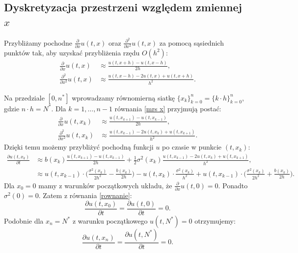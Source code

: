 \documentclass{article}
\begin{document}
\subsection{Dyskretyzacja przestrzeni względem zmiennej $x$}\label{mrs dys}

Przybliżamy pochodne \(\frac{\partial}{\partial x} u(t, x)\) oraz \(\frac{\partial^{2}}{\partial {x}^{2}} u(t, x)\) za pomocą sąsiednich punktów tak, aby uzyskać przybliżenia rzędu $O(h^2)$:
\begin{equation}\label{mrs x}
\begin{aligned}
\frac{\partial}{\partial x} u(t, x) &\approx \frac{u(t, x+h) - u(t, x-h)}{2 h}, \\
\frac{\partial^{2}}{\partial {x}^{2}} u(t, x) &\approx \frac{u(t, x-h) - 2u(t,x)+u(t, x+h)}{h^{2}}.
\end{aligned}
\end{equation}

Na przedziale $[0, n^{*}]$ wprowadzamy równomierną siatkę $\{x_k\}_{k=0}^{n} = \{k\cdot h\}_{k=0}^{n}$, gdzie $n\cdot h = N^{*}$. Dla $k=1,\dots,n-1$ równania \eqref{mrs x} przyjmują postać:
\begin{equation*}
\begin{aligned}
\frac{\partial}{\partial x} u(t, x_{k}) &\approx \frac{u(t, x_{k+1}) - u(t, x_{k-1})}{2 h}, \\
\frac{\partial^{2}}{\partial {x}^{2}} u(t, x_{k}) &\approx \frac{u(t, x_{k-1}) - 2u(t,x_{k})+u(t, x_{k+1})}{h^{2}}.
\end{aligned}
\end{equation*}
Dzięki temu możemy przybliżyć pochodną funkcji $u$ po czasie w punkcie $(t,x_k)$:
\begin{equation}\label{mrs xk}
\begin{aligned}
\frac{\partial u(t, x_k)}{\partial t} &\approx b(x_{k}) \frac{u(t, x_{k+1}) - u(t, x_{k-1})}{2 h} + \frac{1}{2} \sigma^{2}(x_{k}) \frac{u(t, x_{k-1}) - 2u(t,x_{k})+u(t, x_{k+1})}{h^{2}},\\
&\approx u(t, x_{k-1})\cdot\Big(\frac{\sigma^{2}(x_{k})}{2h^{2}} -\frac{b(x_{k})}{2h}\Big) - u(t,x_{k})\cdot\frac{\sigma^{2}(x_{k})}{h^{2}} + u(t,x_{k-1}) \cdot\Big(\frac{\sigma^{2}(x_{k})}{2h^{2}} +\frac{b(x_{k})}{2h}\Big).
\end{aligned}
\end{equation}
Dla $x_0 = 0$ mamy z warunków początkowych układu, że $\frac{\partial}{\partial x} u(t, 0) = 0$. Ponadto $\sigma^{2}(0) = 0$. Zatem z równania \eqref{rownanie}:
\begin{equation}\label{mrs x0}
\frac{\partial u(t, x_{0})}{\partial t} = \frac{\partial u(t, 0)}{\partial t} = 0.
\end{equation}
Podobnie dla $x_{n} = N^{*}$ z warunku początkowego $u(t, N^{*}) = 0$ otrzymujemy:
\begin{equation}\label{mrs xn}
\frac{\partial u(t, x_{n})}{\partial t} = \frac{\partial u(t, N^{*})}{\partial t} = 0.
\end{equation}
\end{document}
